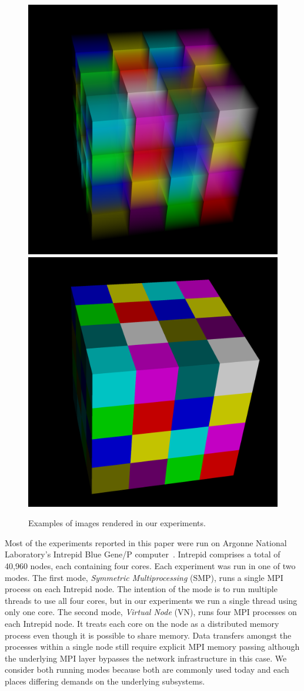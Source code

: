 \documentclass{sig-alternate}
\newcommand*{\lcite}[1]{~\cite{#1}}
\newcommand*{\keyterm}[1]{\emph{#1}}
\begin{document}
\begin{figure}[htbp]
  \centering
  \includegraphics[width=.4\linewidth]{images/TransparentOutput}
  \quad
  \includegraphics[width=.4\linewidth]{images/OpaqueOutput}
  \caption{Examples of images rendered in our experiments.}
  \label{fig:SimpleTimingOutput}
\end{figure}

Most of the experiments reported in this paper were run on Argonne National
Laboratory's Intrepid Blue Gene/P computer\lcite{BlueGeneP}.  Intrepid
comprises a total of 40,960 nodes, each containing four cores.  Each
experiment was run in one of two modes.  The first mode, \keyterm{Symmetric
Multiprocessing} (SMP), runs a single MPI process on each Intrepid
node.  The intention of the mode is to run multiple threads to use all four
cores, but in our experiments we run a single thread using only one core.
The second mode, \keyterm{Virtual Node} (VN), runs four MPI processes on
each Intrepid node.  It treats each core on the node as a distributed
memory process even though it is possible to share memory.  Data
transfers amongst the processes within a single node still require explicit
MPI memory passing although the underlying MPI layer bypasses the network
infrastructure in this case.  We consider both running modes because both
are commonly used today and each places differing demands on the underlying
subsystems.

\end{document}
